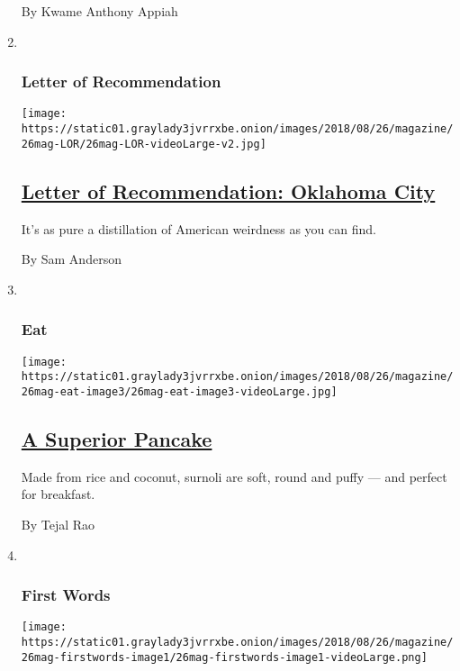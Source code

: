 \begin{enumerate}
  By Kwame Anthony Appiah
\item ~
  \hypertarget{letter-of-recommendation}{%
  \subsubsection{Letter of
  Recommendation}\label{letter-of-recommendation}}

  \texttt{[image: https://static01.graylady3jvrrxbe.onion/images/2018/08/26/magazine/26mag-LOR/26mag-LOR-videoLarge-v2.jpg]}

  \hypertarget{letter-of-recommendation-oklahoma-city}{%
  \subsection{\texorpdfstring{\href{/2018/08/21/magazine/letter-of-recommendation-oklahoma-city.html}{Letter
  of Recommendation: Oklahoma
  City}}{Letter of Recommendation: Oklahoma City}}\label{letter-of-recommendation-oklahoma-city}}

  It's as pure a distillation of American weirdness as you can find.

  By Sam Anderson
\item ~
  \hypertarget{eat}{%
  \subsubsection{Eat}\label{eat}}

  \texttt{[image: https://static01.graylady3jvrrxbe.onion/images/2018/08/26/magazine/26mag-eat-image3/26mag-eat-image3-videoLarge.jpg]}

  \hypertarget{a-superior-pancake}{%
  \subsection{\texorpdfstring{\href{/2018/08/22/magazine/a-superior-pancake.html}{A
  Superior Pancake}}{A Superior Pancake}}\label{a-superior-pancake}}

  Made from rice and coconut, surnoli are soft, round and puffy --- and
  perfect for breakfast.

  By Tejal Rao
\item ~
  \hypertarget{first-words}{%
  \subsubsection{First Words}\label{first-words}}

  \texttt{[image: https://static01.graylady3jvrrxbe.onion/images/2018/08/26/magazine/26mag-firstwords-image1/26mag-firstwords-image1-videoLarge.png]}


\end{enumerate}
